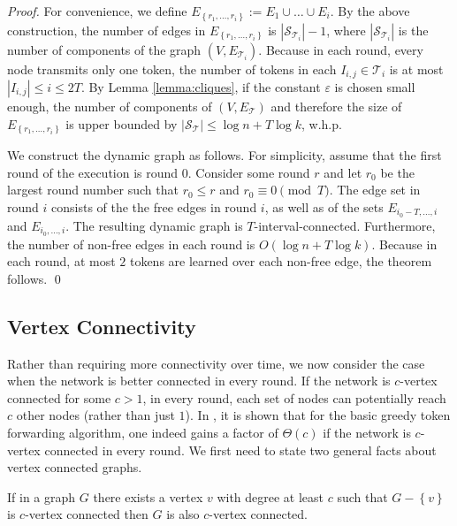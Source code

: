 \documentclass{llncs}
\newcommand{\set}[1]{\left\{#1\right\}}
\newcommand{\eps}{\varepsilon}
\newcommand{\calT}{\mathcal{T}}
\newcommand{\calS}{\mathcal{S}}
\begin{document}
\begin{proof}
    For convenience, we define
    $E_{\set{r_1,\dots,r_i}}:=E_1\cup\dots\cup E_i$. By the above
    construction, the number of edges in $E_{\set{r_1,\dots,r_i}}$ is
    $|\calS_{\calT_{i}}|-1$, where $|\calS_{\calT_i}|$ is the number
    of components of the graph $(V,E_{\calT_i})$. Because in each
    round, every node transmits only one token, the number of tokens
    in each $I_{i,j}\in \calT_i$ is at most $|I_{i,j}|\leq i\leq 2T$.
    By Lemma \ref{lemma:cliques}, if the constant $\eps$ is chosen
    small enough, the number of components of $(V,E_\calT)$ and
    therefore the size of $E_{\set{r_1,\dots,r_i}}$ is upper bounded
    by $|\calS_\calT|\leq \log n + T\log k$, w.h.p.

    We construct the dynamic graph as follows. For simplicity, assume
    that the first round of the execution is round $0$. Consider some
    round $r$ and let $r_0$ be the largest round number such that
    $r_0\leq r$ and $r_0\equiv 0\pmod{T}$. The edge set in round $i$
    consists of the the free edges in round $i$, as well as of the
    sets $E_{i_0-T,\dots,i}$ and $E_{i_0,\dots,i}$. The resulting
    dynamic graph is $T$-interval-connected. Furthermore, the number
    of non-free edges in each round is $O(\log n + T\log k)$. Because
    in each round, at most $2$ tokens are learned over each non-free
    edge, the theorem follows.
\hspace*{\fill}\qed\end{proof}

\subsection{Vertex Connectivity}
\label{sec:connectivity}

\iffalse
\begin{proposition}\label{lem:randomgraph}
For any $n$ and constant $\delta > 0$ an Erdoes-Renyi random graph $G(n,\delta)$
is $\Omega(n)$-vertex-connected with probability at least $1 - 2^{-\Omega(n)}$.
\end{proposition}
\begin{proof}
Do a union bound over all sizes $s$ and all cuts of size $s$ to have at least $k$ neighbors. 
\hspace*{\fill}\qed\end{proof}
\fi

Rather than requiring more connectivity over time, we now consider the
case when the network is better connected in every round. If the
network is $c$-vertex connected for some $c>1$, in every round, each
set of nodes can potentially reach $c$ other nodes (rather than just
$1$). In \cite{KLO}, it is shown that for the basic greedy token
forwarding algorithm, one indeed gains a factor of $\Theta(c)$ if the
network is $c$-vertex connected in every round. We first need to state
two general facts about vertex connected graphs.
\begin{proposition}\label{lem:cconnect}
If in a graph $G$ there exists a vertex $v$ with degree at least $c$ such that $G - \set{v}$ is $c$-vertex connected then $G$
is also $c$-vertex connected. 
\end{proposition}
\end{document}
